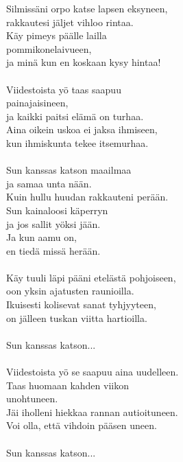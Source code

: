 
Silmissäni orpo katse lapsen eksyneen, \\ rakkautesi jäljet vihloo rintaa. \\ Käy pimeys päälle lailla \\ pommikonelaivueen, \\ ja minä kun en koskaan kysy hintaa! \\ \hspace{10mm} \\ Viidestoista yö taas saapuu \\ painajaisineen, \\ ja kaikki paitsi elämä on turhaa. \\ Aina oikein uskoa ei jaksa ihmiseen, \\ kun ihmiskunta tekee itsemurhaa. \\ \hspace{10mm} \\ Sun kanssas katson maailmaa \\ ja samaa unta nään. \\ Kuin hullu huudan rakkauteni perään. \\ Sun kainaloosi käperryn \\ ja jos sallit yöksi jään. \\ Ja kun aamu on, \\ en tiedä missä herään. \\ \hspace{10mm} \\ Käy tuuli läpi pääni etelästä pohjoiseen, \\ oon yksin ajatusten raunioilla. \\ Ikuisesti kolisevat sanat tyhjyyteen, \\ on jälleen tuskan viitta hartioilla. \\ \hspace{10mm} \\ Sun kanssas katson... \\ \hspace{10mm} \\ Viidestoista yö se saapuu aina uudelleen. \\ Taas huomaan kahden viikon \\ unohtuneen. \\ Jäi iholleni hiekkaa rannan autioituneen. \\ Voi olla, että vihdoin pääsen uneen. \\ \hspace{10mm} \\ Sun kanssas katson...